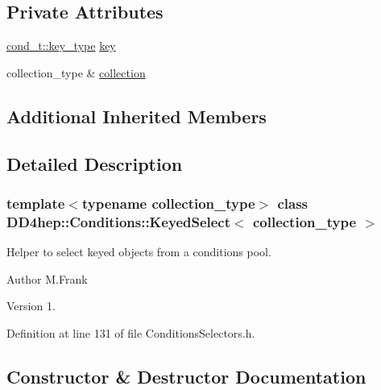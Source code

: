 \subsection*{Private Attributes}
\begin{DoxyCompactItemize}
\item 
\hyperlink{class_d_d4hep_1_1_conditions_1_1_condition_a7528efa762e8cc072ef80ea67c3531f9}{cond\+\_\+t\+::key\+\_\+type} \hyperlink{class_d_d4hep_1_1_conditions_1_1_keyed_select_aaa2b0dfe26393c92a82ff5c203c5398e}{key}
\item 
collection\+\_\+type \& \hyperlink{class_d_d4hep_1_1_conditions_1_1_keyed_select_ace147c1925f1b99fd5582e1a251e6bbd}{collection}
\end{DoxyCompactItemize}
\subsection*{Additional Inherited Members}


\subsection{Detailed Description}
\subsubsection*{template$<$typename collection\+\_\+type$>$\newline
class D\+D4hep\+::\+Conditions\+::\+Keyed\+Select$<$ collection\+\_\+type $>$}

Helper to select keyed objects from a conditions pool. 

\begin{DoxyAuthor}{Author}
M.\+Frank 
\end{DoxyAuthor}
\begin{DoxyVersion}{Version}
1. 
\end{DoxyVersion}


Definition at line 131 of file Conditions\+Selectors.\+h.



\subsection{Constructor \& Destructor Documentation}
\hypertarget{class_d_d4hep_1_1_conditions_1_1_keyed_select_a4158acaaf6c6911619a41d39fe92d247}{}\label{class_d_d4hep_1_1_conditions_1_1_keyed_select_a4158acaaf6c6911619a41d39fe92d247} 
